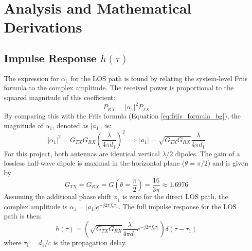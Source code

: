 \section{Analysis and Mathematical Derivations}

\subsection{Impulse Response $h(\tau)$}
The expression for $\alpha_1$ for the LOS path is found by relating the system-level Friis formula to the complex amplitude. The received power is proportional to the squared magnitude of this coefficient:
\begin{equation}
	P_{RX} = |\alpha_1|^2 P_{TX}
\end{equation}
By comparing this with the Friis formula (Equation \ref{eq:friis_formula_bg}), the magnitude of $\alpha_1$, denoted as $|a_1|$, is:
\begin{equation}
	|\alpha_1|^2 = G_{TX} G_{RX} \left(\frac{\lambda}{4\pi d_1}\right)^2 \implies |a_1| = \sqrt{G_{TX}G_{RX}} \frac{\lambda}{4\pi d_1}
\end{equation}
For this project, both antennas are identical vertical $\lambda/2$ dipoles. The gain of a lossless half-wave dipole is maximal in the horizontal plane ($\theta = \pi/2$) and is given by 
\begin{equation}
	G_{TX} = G_{RX} = G\left(\theta=\frac{\pi}{2}\right) = \frac{16}{3\pi} \approx 1.6976
\end{equation}
Assuming the additional phase shift $\phi_1$ is zero for the direct LOS path, the complex amplitude is $\alpha_1 = |a_1|e^{-j2\pi f_c \tau_1}$. The full impulse response for the LOS path is then:
\begin{equation}
	h(\tau) = \left( \sqrt{G_{TX}G_{RX}} \frac{\lambda}{4\pi d_1} e^{-j2\pi f_c \tau_1} \right) \delta(\tau - \tau_1)
	\label{eq:los_impulse_response_derived}
\end{equation}
where $\tau_1 = d_1/c$ is the propagation delay.

